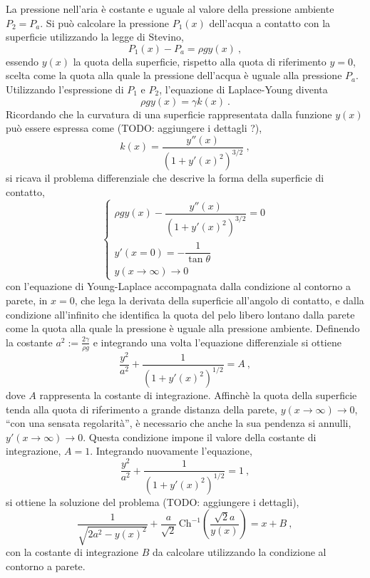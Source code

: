 La pressione nell'aria è costante e uguale al valore della pressione ambiente $P_2 = P_a$.
Si può calcolare la pressione $P_1(x)$ dell'acqua a contatto con la superficie utilizzando la legge di Stevino,
\begin{equation}
  P_1(x) - P_a = \rho g y(x) \ ,
\end{equation}
essendo $y(x)$ la quota della superficie, rispetto alla quota di riferimento $y=0$, scelta come la quota alla quale la pressione dell'acqua è uguale alla pressione $P_a$. Utilizzando l'espressione di $P_1$ e $P_2$, l'equazione di Laplace-Young diventa
\begin{equation}
 \rho g y(x) = \gamma k(x) \ .
\end{equation}
Ricordando che la curvatura di una superficie rappresentata dalla funzione $y(x)$ può essere espressa come {\color{red} (TODO: aggiungere i dettagli ?)},
\begin{equation}
 k(x) = \dfrac{y''(x)}{\left( 1 + y'(x)^2 \right)^{3/2}} \ ,
\end{equation}
si ricava il problema differenziale che descrive la forma della superficie di contatto,
\begin{equation}
\begin{cases}
 \rho g y(x) - \dfrac{y''(x)}{\left( 1 + y'(x)^2 \right)^{3/2}} = 0 \\
 y'(x=0) = -\dfrac{1}{\tan\theta} \\
 y(x\rightarrow \infty) \rightarrow 0
\end{cases}
\end{equation}
con l'equazione di Young-Laplace accompagnata dalla condizione al contorno a parete, in $x=0$, che lega la derivata della superficie all'angolo di contatto, e dalla condizione all'infinito che identifica la quota del pelo libero lontano dalla parete come la quota alla quale la pressione è uguale alla pressione ambiente.
%
\newline \noindent
Definendo la costante $a^2:=\frac{2\gamma}{\rho g}$ e integrando una volta l'equazione differenziale si ottiene
\begin{equation}
 \dfrac{y^2}{a^2} + \dfrac{1}{(1 + y'(x)^2)^{1/2}} = A \ ,
\end{equation}
dove $A$ rappresenta la costante di integrazione. Affinchè la quota della superficie tenda alla quota di riferimento a grande distanza della parete, $y(x\rightarrow\infty) \rightarrow 0$, ``con una sensata regolarità'', è necessario che anche la sua pendenza si annulli, $y'(x\rightarrow\infty) \rightarrow 0$. Questa condizione impone il valore della costante di integrazione, $A = 1$. Integrando nuovamente l'equazione,
\begin{equation}
 \dfrac{y^2}{a^2} + \dfrac{1}{(1 + y'(x)^2)^{1/2}} = 1 \ ,
\end{equation}
si ottiene la soluzione del problema {\color{red} (TODO: aggiungere i dettagli)},
\begin{equation}
 \dfrac{1}{\sqrt{2 a^2 - y(x)^2}} +
 \dfrac{a}{\sqrt{2}} \, \text{Ch}^{-1} \left( \dfrac{\sqrt{2} a}{y(x)} \right) = x + B \ ,
\end{equation}
con la costante di integrazione $B$ da calcolare utilizzando la condizione al contorno a parete.

